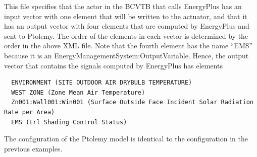 This file specifies that the actor in the BCVTB that calls EnergyPlus has an input vector with one element that will be written to the actuator, and that it has an output vector with four elements that are computed by EnergyPlus and sent to Ptolemy. The order of the elements in each vector is determined by the order in the above XML file. Note that the fourth element has the name ``EMS'' because it is an EnergyManagementSystem:OutputVariable. Hence, the output vector that contains the signals computed by EnergyPlus has elements

\begin{lstlisting}
  ENVIRONMENT (SITE OUTDOOR AIR DRYBULB TEMPERATURE)
  WEST ZONE (Zone Mean Air Temperature)
  Zn001:Wall001:Win001 (Surface Outside Face Incident Solar Radiation Rate per Area)
  EMS (Erl Shading Control Status)
\end{lstlisting}

The configuration of the Ptolemy model is identical to the configuration in the previous examples.
